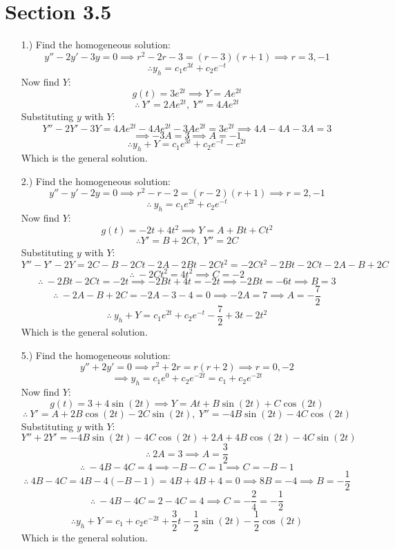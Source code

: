 \documentclass[12pt]{article}
\begin{document}
\pagestyle{fancy}
\fancyhead{}

\normalsize
\section*{Section 3.5}
\begin{itemize}
    \item [1.)] Find the homogeneous solution:
    \[y''-2y'-3y=0\implies r^2-2r-3=(r-3)(r+1)\implies r=3,-1\]
    \[\therefore y_h=c_1e^{3t}+c_2e^{-t}\]
    Now find $Y$:
    \[g(t)=3e^{2t}\implies Y=Ae^{2t}\]
    \[\therefore\ Y'=2Ae^{2t},\ Y''=4Ae^{2t}\]
    Substituting $y$ with $Y$:
    \[Y''-2Y'-3Y=4Ae^{2t}-4Ae^{2t}-3Ae^{2t}=3e^{2t}\implies 4A-4A-3A=3\]
    \[\implies-3A=3\implies A=-1\]
    \[\therefore y_h+Y=c_1e^{3t}+c_2e^{-t}-e^{2t}\]
    Which is the general solution.

    \item [2.)] Find the homogeneous solution:
    \[y''-y'-2y=0\implies r^2-r-2=(r-2)(r+1)\implies r=2,-1\]
    \[\therefore\ y_h=c_1e^{2t}+c_2e^{-t}\]
    Now find $Y$:
    \[g(t)=-2t+4t^2\implies Y=A+Bt+Ct^2\]
    \[\therefore Y'=B+2Ct,\ Y''=2C\]
    Substituting $y$ with $Y$:
    \[Y''-Y'-2Y=2C-B-2Ct-2A-2Bt-2Ct^2=-2Ct^2-2Bt-2Ct-2A-B+2C\]
    \[\therefore\ -2Ct^2=4t^2\implies C=-2\]
    \[\therefore\ -2Bt-2Ct=-2t\implies-2Bt+4t=-2t\implies-2Bt=-6t\implies B=3\]
    \[\therefore\ -2A-B+2C=-2A-3-4=0\implies-2A=7\implies A=-\frac{7}{2}\]
    \[\therefore\ y_h+Y=c_1e^{2t}+c_2e^{-t}-\frac{7}{2}+3t-2t^2\]
    Which is the general solution.

    \item [5.)] Find the homogeneous solution:
    \[y''+2y'=0\implies r^2+2r=r(r+2)\implies r=0,-2\]
    \[\implies y_h=c_1e^0+c_2e^{-2t}=c_1+c_2e^{-2t}\]
    Now find $Y$:
    \[g(t)=3+4\sin(2t)\implies Y=At+B\sin(2t)+C\cos(2t)\]
    \[\therefore\ Y'=A+2B\cos(2t)-2C\sin(2t),\ Y''=-4B\sin(2t)-4C\cos(2t)\]
    Substituting $y$ with $Y$:
    \[Y''+2Y'=-4B\sin(2t)-4C\cos(2t)+2A+4B\cos(2t)-4C\sin(2t)\]
    \[\therefore\ 2A=3\implies A=\frac{3}{2}\]
    \[\therefore\ -4B-4C=4\implies -B-C=1\implies C=-B-1\]
    \[\therefore\ 4B-4C=4B-4(-B-1)=4B+4B+4=0\implies8B=-4\implies B=-\frac{1}{2}\]
    \[\therefore\ -4B-4C=2-4C=4\implies C=-\frac{2}{4}=-\frac{1}{2}\]
    \[\therefore y_h+Y=c_1+c_2e^{-2t}+\frac{3}{2}t-\frac{1}{2}\sin(2t)-\frac{1}{2}\cos(2t)\]
    Which is the general solution.
    

\end{itemize}
\end{document}
